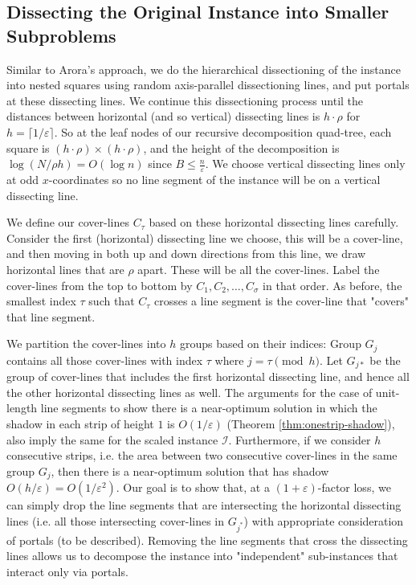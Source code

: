 \documentclass[pdflatex,sn-mathphys-num]{sn-jnl}
\theoremstyle{thmstyleone}
\newcommand{\eps}{\varepsilon}
\begin{document}
\subsection{Dissecting the Original Instance into Smaller Subproblems}\label{sec:dissection}

Similar to Arora's approach, we do the hierarchical dissectioning of the instance into nested squares using random axis-parallel dissectioning lines, and put portals at these dissecting lines. We continue this dissectioning process until the distances between horizontal (and so vertical) dissecting lines is $h\cdot\rho$ for $h=\lceil 1/\eps\rceil$. So at the leaf nodes of our recursive decomposition quad-tree, each square is $(h\cdot\rho)\times (h\cdot\rho)$, and the height of the decomposition is $\log (N/\rho h)=O(\log n)$ since $B\leq\frac{n}{\eps}$. We choose vertical dissecting lines only at odd $x$-coordinates so no line segment of the instance will be on a vertical dissecting line.

We define our cover-lines $C_\tau$ based on these horizontal dissecting lines carefully.
Consider the first (horizontal) dissecting line we choose, this will be a cover-line, and then moving in both up and down directions from this line, we draw horizontal lines that are $\rho$ apart. These will be all the cover-lines.
Label the cover-lines from the top to bottom by $C_1, C_2,\dots, C_\sigma$ in that order. As before, the smallest index $\tau$ such that $C_\tau$ crosses a line segment is the cover-line that "covers" that line segment. 

We partition the cover-lines into $h$ groups based on their indices: Group $G_j$ contains all those cover-lines with index $\tau$ where $j=\tau \pmod h$.
Let $G_{j*}$ be the group of cover-lines that includes the first horizontal dissecting line, and hence all the other horizontal dissecting lines as well.
The arguments for the case of unit-length line segments to show there is a near-optimum solution in which the shadow in each strip of height $1$ is $O(1/\eps)$ (Theorem \ref{thm:onestrip-shadow}), also imply the same for the scaled instance $\mathcal I$. Furthermore, if we consider $h$
consecutive strips, i.e. the area between two consecutive cover-lines in the same group $ G_j $,
then there is a near-optimum solution that has shadow $O(h/\eps)=O(1/\eps^2)$.
Our goal is to show that, at a $(1+\eps)$-factor loss, we can simply drop the line segments that are intersecting the horizontal dissecting lines (i.e. all those intersecting cover-lines in $G_{j^*}$) with appropriate 
consideration of portals (to be described). Removing the line segments that cross the dissecting lines allows us to decompose the instance into "independent" sub-instances that interact only via portals.
\end{document}
